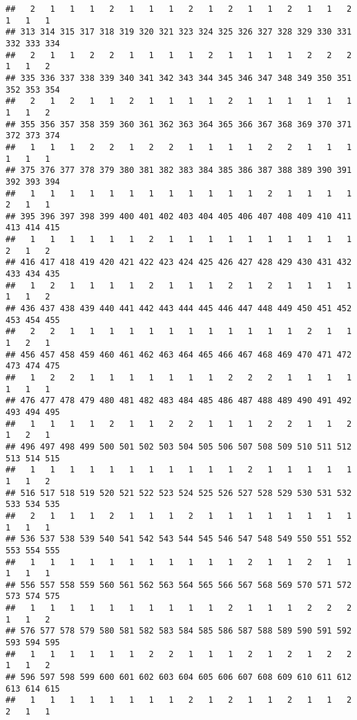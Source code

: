 \documentclass[
]{article}
\begin{document}
\begin{verbatim}
##   2   1   1   1   2   1   1   1   2   1   2   1   1   2   1   1   2   1   1   1 
## 313 314 315 317 318 319 320 321 323 324 325 326 327 328 329 330 331 332 333 334 
##   2   1   1   2   2   1   1   1   1   2   1   1   1   1   2   2   2   1   1   2 
## 335 336 337 338 339 340 341 342 343 344 345 346 347 348 349 350 351 352 353 354 
##   2   1   2   1   1   2   1   1   1   1   2   1   1   1   1   1   1   1   1   2 
## 355 356 357 358 359 360 361 362 363 364 365 366 367 368 369 370 371 372 373 374 
##   1   1   1   2   2   1   2   2   1   1   1   1   2   2   1   1   1   1   1   1 
## 375 376 377 378 379 380 381 382 383 384 385 386 387 388 389 390 391 392 393 394 
##   1   1   1   1   1   1   1   1   1   1   1   1   2   1   1   1   1   2   1   1 
## 395 396 397 398 399 400 401 402 403 404 405 406 407 408 409 410 411 413 414 415 
##   1   1   1   1   1   1   2   1   1   1   1   1   1   1   1   1   1   2   1   2 
## 416 417 418 419 420 421 422 423 424 425 426 427 428 429 430 431 432 433 434 435 
##   1   2   1   1   1   1   2   1   1   1   2   1   2   1   1   1   1   1   1   2 
## 436 437 438 439 440 441 442 443 444 445 446 447 448 449 450 451 452 453 454 455 
##   2   2   1   1   1   1   1   1   1   1   1   1   1   1   2   1   1   1   2   1 
## 456 457 458 459 460 461 462 463 464 465 466 467 468 469 470 471 472 473 474 475 
##   1   2   2   1   1   1   1   1   1   1   2   2   2   1   1   1   1   1   1   1 
## 476 477 478 479 480 481 482 483 484 485 486 487 488 489 490 491 492 493 494 495 
##   1   1   1   1   2   1   1   2   2   1   1   1   2   2   1   1   2   1   2   1 
## 496 497 498 499 500 501 502 503 504 505 506 507 508 509 510 511 512 513 514 515 
##   1   1   1   1   1   1   1   1   1   1   1   2   1   1   1   1   1   1   1   2 
## 516 517 518 519 520 521 522 523 524 525 526 527 528 529 530 531 532 533 534 535 
##   2   1   1   1   2   1   1   1   2   1   1   1   1   1   1   1   1   1   1   1 
## 536 537 538 539 540 541 542 543 544 545 546 547 548 549 550 551 552 553 554 555 
##   1   1   1   1   1   1   1   1   1   1   1   2   1   1   2   1   1   1   1   1 
## 556 557 558 559 560 561 562 563 564 565 566 567 568 569 570 571 572 573 574 575 
##   1   1   1   1   1   1   1   1   1   1   2   1   1   1   2   2   2   1   1   2 
## 576 577 578 579 580 581 582 583 584 585 586 587 588 589 590 591 592 593 594 595 
##   1   1   1   1   1   1   2   2   1   1   1   2   1   2   1   2   2   1   1   2 
## 596 597 598 599 600 601 602 603 604 605 606 607 608 609 610 611 612 613 614 615 
##   1   1   1   1   1   1   1   1   2   1   2   1   1   2   1   1   2   2   1   1 

\end{verbatim}
\end{document}
